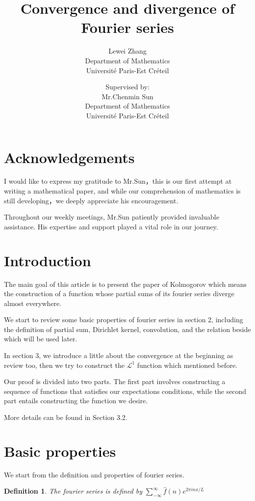 \documentclass{article}
\title{Convergence and divergence of Fourier series}
\author{Lewei Zhang\\
Department of Mathematics\\
Université Paris-Est Créteil\\
\texttt{}
\and
Supervised by:\\
Mr.Chenmin Sun\\
Department of Mathematics\\
Université Paris-Est Créteil\\
\texttt{}
}
\newtheorem{definition}{Definition}
\begin{document}
\clearpage

\maketitle
\tableofcontents

\newpage


\section*{Acknowledgements}
I would like to express my gratitude to Mr.Sun，this is our first attempt at writing a mathematical paper, and while our comprehension of mathematics is still developing，we deeply appreciate his encouragement. 
\par Throughout our weekly meetings, Mr.Sun patiently provided invaluable assistance. His expertise and support played a vital role in our journey.

\newpage


\section{Introduction}
The main goal of this article is to present the paper of Kolmogorov which means the construction of a function  whose partial sums of its fourier series diverge almost everywhere.\par
We start to  review some basic properties of fourier series in section 2, including the definition of partial sum, Dirichlet kernel, convolution, and the relation beside which will be used later.\par
In section 3, we introduce a little about the convergence at the beginning as review too, then we try to construct the $ \mathcal{L} ^1 $ function which mentioned before.\par
Our proof is divided into two parts. The first part involves constructing a sequence of functions that satisfies our expectations conditions, while the second part entails constructing the function we desire.\par
More details can be found in Section 3.2.






\section{Basic properties}
We start from the definition and properties of fourier series.

\begin{definition}%
    The fourier series is defined by $ \sum\limits_{-\infty}^{\infty} \hat{f}(n)e^{2\pi inx/L}$
\end{definition}
\end{document}
